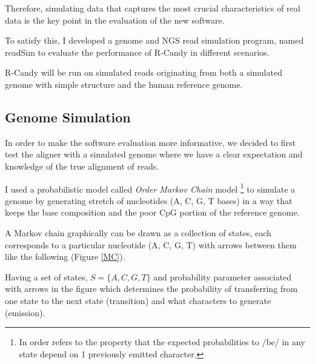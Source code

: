\documentclass[11pt,a4paper]{report}
\begin{document}
Therefore, simulating data that captures the most crucial characteristics 
of real data is the key point in the evaluation of the new software.

To satisfy this, I developed a genome and NGS read simulation program, named
readSim to evaluate the performance of R-Candy in different scenarios.

R-Candy will be run on simulated reads originating from both a simulated
genome with simple structure and the human reference genome.
 

\subsection{Genome Simulation} 
\label{ Genome Simulation }


In order to make the software evaluation more informative, we decided to
first test the aligner with a simulated genome where we have a clear 
expectation and knowledge of the true alignment of reads.

I used a probabilistic model called \emph{ Order Markov Chain}
model \footnote{In  order refers to the property
that the expected probabilities to /be/ in any state depend on 1
previously emitted character.} to simulate a genome by generating 
stretch of nucleotides (A, C, G, T bases) in a way that  keeps the base 
composition and the poor CpG portion of the reference genome.

A Markov chain graphically can be drawn as a collection of states, 
each corresponds to a particular nucleotide (A, C, G, T) with arrows
between them like the following (Figure \ref{MC}). 

Having a set of states,  $ S= \{ A, C,  G, T \}$  and probability
parameter  associated with arrows in the figure which determines the
probability of transferring from one state to the next state (transition)
and what characters to generate (emission).
\end{document}
